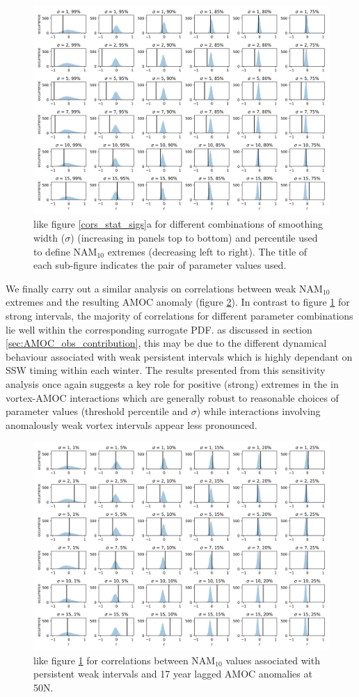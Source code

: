 \begin{figure}[h!]
\begin{center}
\noindent\includegraphics[width =0.5\linewidth]{Figures/Figures-surface/cors_sigs_thresh_and_sigma.png} 
\caption{like figure \ref{cors_stat_sigs}a for different combinations of smoothing width ($\sigma$) (increasing in panels top to bottom) and percentile used to define NAM$_{10}$ extremes (decreasing left to right). The title of each sub-figure indicates the pair of parameter values used.}%
\label{cors_stats_parameters_strong}
\end{center}
\end{figure}

We finally carry out a similar analysis on correlations between weak NAM$_{10}$ extremes and the resulting AMOC anomaly (figure \ref{cors_stats_parameters_weak}). In contrast to figure \ref{cors_stats_parameters_strong} for strong intervals, the majority of correlations for different parameter combinations lie well within the corresponding surrogate PDF. as discussed in section \ref{sec:AMOC_obs_contribution}, this may be due to the different dynamical behaviour associated with weak persistent intervals which is highly dependant on SSW timing within each winter. The results presented from this sensitivity analysis once again suggests a key role for positive (strong) extremes in the in vortex-AMOC interactions which are generally robust to reasonable choices of parameter values (threshold percentile and $\sigma$) while interactions involving anomalously weak vortex intervals appear less pronounced. 

\begin{figure}[h!]
\begin{center}
\noindent\includegraphics[width =0.5\linewidth]{Figures/Figures-surface/cors_sigs_thresh_and_sigma_weak.png} 
\caption{like figure \ref{cors_stats_parameters_strong} for correlations between NAM$_{10}$ values associated with persistent weak intervals and 17 year lagged AMOC anomalies at 50N.}
\label{cors_stats_parameters_weak}
\end{center}
\end{figure}

